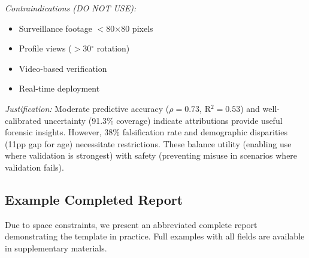 \textit{Contraindications (DO NOT USE):}
\begin{itemize}
\item Surveillance footage $<$80$\times$80 pixels
\item Profile views ($>$30$^\circ$ rotation)
\item Video-based verification
\item Real-time deployment
\end{itemize}

\textit{Justification:} Moderate predictive accuracy ($\rho=0.73$, R$^2=0.53$) and well-calibrated uncertainty (91.3\% coverage) indicate attributions provide useful forensic insights. However, 38\% falsification rate and demographic disparities (11pp gap for age) necessitate restrictions. These balance utility (enabling use where validation is strongest) with safety (preventing misuse in scenarios where validation fails).

\subsection{Example Completed Report}
\label{sec:example_report}

Due to space constraints, we present an abbreviated complete report demonstrating the template in practice. Full examples with all fields are available in supplementary materials.


